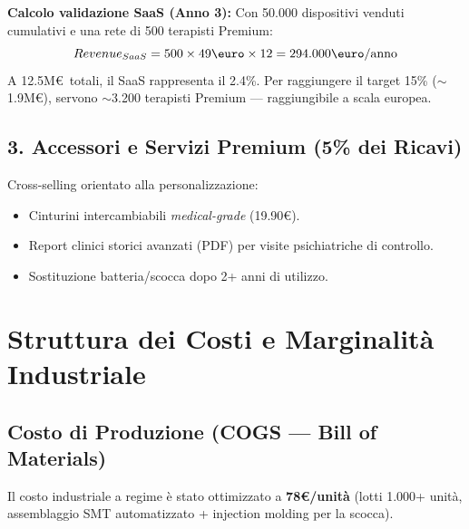 \documentclass[12pt,a4paper]{article}
\begin{document}
\textbf{Calcolo validazione SaaS (Anno 3):}
Con 50.000 dispositivi venduti cumulativi e una rete di 500 terapisti Premium:
$$Revenue_{SaaS} = 500 \times 49\text{\euro} \times 12 = 294.000\text{\euro/anno}$$
A 12.5M\euro\ totali, il SaaS rappresenta il 2.4\%. Per raggiungere il target 15\% ($\sim$1.9M\euro), servono $\sim$3.200 terapisti Premium --- raggiungibile a scala europea.

\subsection{3. Accessori e Servizi Premium (5\% dei Ricavi)}
Cross-selling orientato alla personalizzazione:
\begin{itemize}
    \item Cinturini intercambiabili \textit{medical-grade} (19.90\euro).
    \item Report clinici storici avanzati (PDF) per visite psichiatriche di controllo.
    \item Sostituzione batteria/scocca dopo 2+ anni di utilizzo.
\end{itemize}

\section{Struttura dei Costi e Marginalità Industriale}

\subsection{Costo di Produzione (COGS --- Bill of Materials)}
Il costo industriale a regime è stato ottimizzato a \textbf{78\euro/unità} (lotti 1.000+ unità, assemblaggio SMT automatizzato + injection molding per la scocca).
\end{document}
